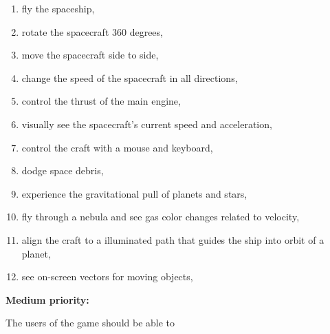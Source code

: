 \begin{multicols}{2}
\begin{enumerate}

  \item fly the spaceship,

  \item rotate the spacecraft 360 degrees,

  \item move the spacecraft side to side,

  \item change the speed of the spacecraft in all directions, 

  \item control the thrust of the main engine,

  \item visually see the spacecraft's current speed and acceleration,

  \item control the craft with a mouse and keyboard,
  
  \item dodge space debris,

  \item experience the gravitational pull of planets and stars, 

  \item fly through a nebula and see gas color changes related to velocity,

  \item align the craft to a illuminated path that guides the ship into orbit of a planet,

  \item see on-screen vectors for moving objects,

\end{enumerate}
\end{multicols}

\noindent \textbf{Medium priority:}

The users of the game should be able to

